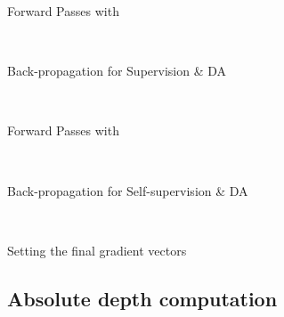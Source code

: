 \documentclass[journal]{IEEEtran}
\begin{document}
{
\begin{algorithm}
\caption{Computing the gradients , , ,  for a mini-batch .  refers to back-propagation on  with respect to weights .  is the empty set.}
\label{alg:gradientcomputation}
\end{algorithm}
\begin{minipage}{0.9\columnwidth}
{\centering Forward Passes with \par}
\vspace{-0.3cm}

\\
{\centering Back-propagation for Supervision \& DA\par}
\vspace{-0.3cm}

\\
{\centering Forward Passes with \par}
\vspace{-0.3cm}

\\
{\centering Back-propagation for Self-supervision \& DA\par}
\vspace{-0.3cm}

\\
{\centering Setting the final gradient vectors\par}
\vspace{-0.3cm}

\end{minipage}
}


\renewrobustcmd{\boldmath}{}
\newrobustcmd{\B}{\bfseries}
\newrobustcmd{\IL}{\underline}
\addtolength{\tabcolsep}{-4.1pt}


\subsection{Absolute depth computation} 
\label{ssec:scaling}
\end{document}
